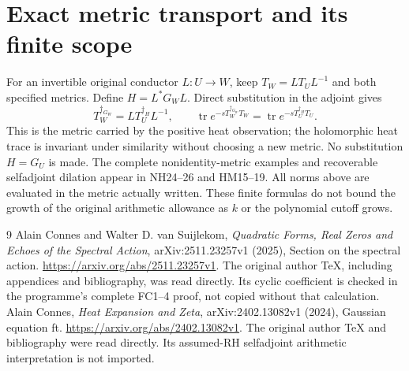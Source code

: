 \documentclass[11pt]{article}
\newcommand{\tr}{\operatorname{tr}}
\begin{document}
\section{Exact metric transport and its finite scope}
For an invertible original conductor \(L:U\to W\), keep
\(T_W=LT_UL^{-1}\) and both specified metrics. Define
\(H=L^*G_WL\). Direct substitution in the adjoint gives
\[
 T_W^{\dagger_{G_W}}=L T_U^{\dagger_H}L^{-1},\qquad
 \tr e^{-sT_W^{\dagger_{G_W}}T_W}
 =\tr e^{-sT_U^{\dagger_H}T_U}.
 \tag{DS12}
\]
This is the metric carried by the positive heat observation; the
holomorphic heat trace is invariant under similarity without choosing
a new metric. No substitution \(H=G_U\) is made. The complete
nonidentity-metric examples and recoverable selfadjoint dilation appear
in NH24--26 and HM15--19. All norms above are evaluated in the metric
actually written. These finite formulas do not bound the growth of the
original arithmetic allowance as \(k\) or the polynomial cutoff grows.

\begin{thebibliography}{9}
 Alain Connes and Walter D. van Suijlekom,
\emph{Quadratic Forms, Real Zeros and Echoes of the Spectral Action},
arXiv:2511.23257v1 (2025), Section on the spectral action.
\url{https://arxiv.org/abs/2511.23257v1}.
The original author TeX, including appendices and bibliography, was
read directly. Its cyclic coefficient is checked in the programme's
complete FC1--4 proof, not copied without that calculation.
 Alain Connes, \emph{Heat Expansion and Zeta},
arXiv:2402.13082v1 (2024), Gaussian equation ft.
\url{https://arxiv.org/abs/2402.13082v1}.
The original author TeX and bibliography were read directly.
Its assumed-RH selfadjoint arithmetic interpretation is not imported.
\end{thebibliography}
\end{document}
